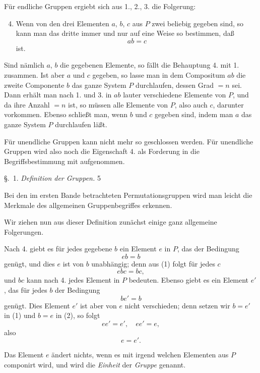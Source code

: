 \documentclass[12pt,a4paper]{book}
\begin{document}
F\"ur endliche Gruppen ergiebt sich aus 1., 2., 3. die Folgerung:

\begin{enumerate}
\setcounter{enumi}{3}
\item Wenn von den drei Elementen $a$, $b$, $c$ aus $P$ zwei beliebig gegeben sind, so kann man das dritte immer und nur auf eine Weise so bestimmen, da\ss
\[ab = c\]
ist.
\end{enumerate}

Sind n\"amlich $a$, $b$ die gegebenen Elemente, so f\"allt die Behauptung 4. mit 1. zusammen. Ist aber $a$ und $c$ gegeben, so lasse man in dem Compositum $ab$ die zweite Componente $b$ das ganze System $P$ durchlaufen, dessen Grad $= n$ sei. Dann erh\"alt man nach 1. und 3. in $ab$ lauter verschiedene Elemente von $P$, und da ihre Anzahl $= n$ ist, so m\"ussen alle Elemente von $P$, also auch $c$, darunter vorkommen. Ebenso schlie\ss t man, wenn $b$ und $c$ gegeben sind, indem man $a$ das ganze System $P$ durchlaufen l\"a\ss t.

F\"ur unendliche Gruppen kann nicht mehr so geschlossen werden. F\"ur unendliche Gruppen wird also noch die Eigenschaft 4. als Forderung in die Begriffsbestimmung mit aufgenommen.

\newpage
\noindent\S.~1. \hfill \textit{Definition der Gruppen.} \hfill 5

\vspace{0.3cm}

Bei den im ersten Bande betrachteten Permutationsgruppen wird man leicht die Merkmale des allgemeinen Gruppenbegriffes erkennen.

Wir ziehen nun aus dieser Definition zun\"achst einige ganz allgemeine Folgerungen.

Nach 4. giebt es f\"ur jedes gegebene $b$ ein Element $e$ in $P$, das der Bedingung
\begin{equation}
eb = b
\end{equation}
gen\"ugt, und dies $e$ ist von $b$ unabh\"angig; denn aus (1) folgt f\"ur jedes $c$
\[ebc = bc,\]
und $bc$ kann nach 4. jedes Element in $P$ bedeuten. Ebenso giebt es ein Element $e'$, das f\"ur jedes $b$ der Bedingung
\begin{equation}
be' = b
\end{equation}
gen\"ugt. Dies Element $e'$ ist aber von $e$ nicht verschieden; denn setzen wir $b = e'$ in (1) und $b = e$ in (2), so folgt
\[ee' = e',\quad ee' = e,\]
also
\[e = e'.\]

Das Element $e$ \"andert nichts, wenn es mit irgend welchen Elementen aus $P$ componirt wird, und wird die \textit{Einheit} der \textit{Gruppe} genannt.
\end{document}
